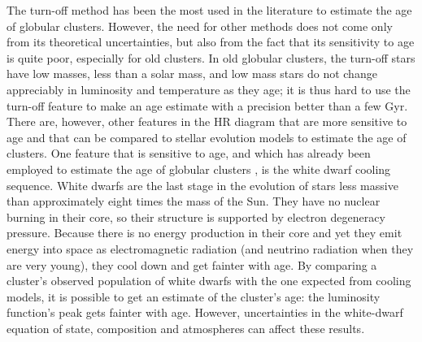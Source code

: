 \documentclass[useAMS,usenatbib]{mnras}
\begin{document}
The turn-off method has been the most used in the literature to estimate the age of globular clusters. However, the need for other methods does not come only from its theoretical uncertainties,  but also from the fact that its sensitivity to age is quite poor, especially for old clusters. In old globular clusters, the turn-off stars have low masses, less than a solar mass, and low mass stars do not change appreciably in luminosity and temperature as they age; it is thus hard to use the turn-off feature to make an age estimate with a precision better than a few Gyr. There are, however, other features in the HR diagram that are more sensitive to age and that can be compared to stellar evolution models to estimate the age of clusters.  One feature that is sensitive to age, and which has already been employed to estimate the age of globular clusters \citep{2013Natur.500...51H},  is the white dwarf cooling sequence. White dwarfs are the last stage in the evolution of stars less massive than approximately eight times the mass of the Sun. They have no nuclear burning in their core, so their structure is supported by electron degeneracy pressure. Because there is no energy production in their core and yet they emit energy into space as electromagnetic radiation (and neutrino radiation when they are very young), they cool down and get fainter with age. By comparing a cluster's observed population of white dwarfs with the one expected from cooling models, it is possible to get an estimate of the cluster's age: the luminosity function's peak gets fainter with age. However, uncertainties in the white-dwarf equation of state, composition and atmospheres can affect these results.
\end{document}
